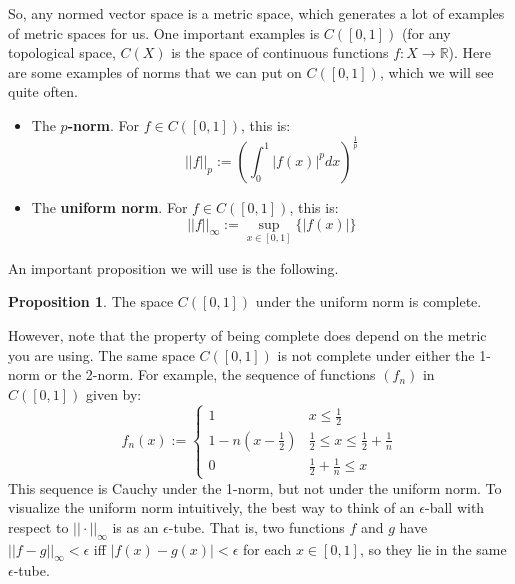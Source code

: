 \documentclass[11pt, oneside]{amsart}   	%
\theoremstyle{definition}
\newtheorem{prop}{Proposition}[section]
\begin{document}
	So, any normed vector space is a metric space, which generates a lot of examples of metric spaces for us. One important examples is $C([0, 1])$ (for 
	any topological space, $C(X)$ is the space of continuous functions $f : X\rightarrow\mathbb R$). Here are some examples of norms that we can put on 
	$C([0, 1])$, which we will see quite often. 
	\begin{itemize}
		\item The \textbf{$p$-norm}. For $f\in C([0, 1])$, this is:
		$$
			||f||_p := (\int_0^1|f(x)|^p dx)^{\frac{1}{p}}
		$$
		\item The \textbf{uniform norm}. For $f\in C([0, 1])$, this is:
		$$
			||f||_\infty := \sup_{x\in [0, 1]} \{|f(x)|\}
		$$
	\end{itemize}
	An important proposition we will use is the following.
	\begin{prop}
		The space $C([0, 1])$ under the uniform norm is complete.
	\end{prop}
	However, note that the property of being complete does depend on the metric you are using. The same space $C([0, 1])$ is not complete under either the 
	1-norm or the 2-norm. For example, the sequence of functions $(f_n)$ in $C([0, 1])$ given by:
	$$
		f_n(x) := \begin{cases}
			1 & x\leq\frac{1}{2} \\
			1 - n(x - \frac{1}{2}) & \frac{1}{2}\leq x \leq\frac{1}{2} + \frac{1}{n} \\
			0 & \frac{1}{2} + \frac{1}{n} \leq x
		\end{cases}
	$$
	This sequence is Cauchy under the 1-norm, but not under the uniform norm. To visualize the uniform norm intuitively, the best way to think of an $\epsilon$-ball 
	with respect to $||\cdot||_\infty$ is as an $\epsilon$-tube. That is, two functions $f$ and $g$ have $||f - g||_\infty < \epsilon$ iff $|f(x) - g(x)| < \epsilon$ for each $x
	\in [0, 1]$, so they lie in the same $\epsilon$-tube.
	
	
\end{document}
